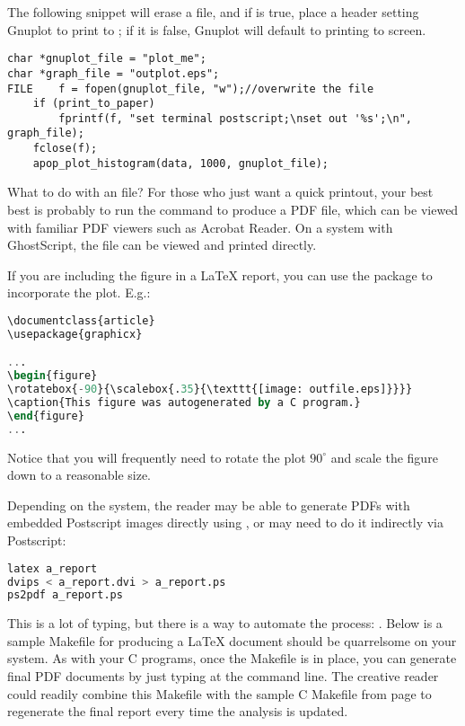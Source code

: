 The following snippet will erase a file, and
if  is true, place a header setting Gnuplot to
print to ; if it is false, Gnuplot will default
to printing to screen.

\begin{lstlisting}
char *gnuplot_file = "plot_me";
char *graph_file = "outplot.eps";
FILE    f = fopen(gnuplot_file, "w");//overwrite the file
    if (print_to_paper)
        fprintf(f, "set terminal postscript;\nset out '%s';\n", graph_file);
    fclose(f);
    apop_plot_histogram(data, 1000, gnuplot_file);
\end{lstlisting}

What to do with an  file? For those who just want a quick
printout, your best best is probably to run the command 
to produce a PDF file, which can be viewed with familiar PDF viewers
such as Acrobat Reader. On a system with GhostScript, the  file
can be viewed and printed directly.

 
If you are including the  figure in a \LaTeX{} report, you can use the
 package to incorporate the plot. E.g.:
\begin{lstlisting}[language=sql]
\documentclass{article}
\usepackage{graphicx}

...
\begin{figure}
\rotatebox{-90}{\scalebox{.35}{\texttt{[image: outfile.eps]}}}}
\caption{This figure was autogenerated by a C program.}
\end{figure}
...

\end{lstlisting}
Notice that you will frequently need to rotate the plot $90^\circ$
and scale the figure down to a reasonable size.

Depending on the system, the reader may be able to generate PDFs with
embedded Postscript images directly using , or may
need to do it indirectly via Postscript: 
\begin{lstlisting}[language=sql]
latex a_report
dvips < a_report.dvi > a_report.ps
ps2pdf a_report.ps
\end{lstlisting}

This is a lot of typing, but there is a way to automate the process:
. Below is a sample Makefile for producing a \LaTeX{} document
should  be quarrelsome on your system. As with your C
programs, once the Makefile is in place, you can generate final PDF
documents by just typing  at the command line. The
creative reader could readily combine this Makefile with the sample C
Makefile from page \pageref{make} to regenerate the final report every
time the analysis is updated.

